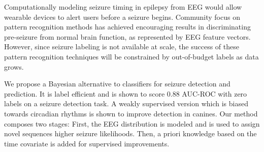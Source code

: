 
Computationally modeling seizure timing in epilepsy from EEG would allow wearable devices to alert users before a seizure begins. Community focus on pattern recognition methods has achieved encouraging results in discriminating pre-seizure from normal brain function, as represented by EEG feature vectors. However, since seizure labeling is not available at scale, the success of these pattern recognition techniques will be constrained by out-of-budget labels as data grows. 

We propose a Bayesian alternative to classifiers for seizure detection and prediction. It is label efficient and is shown to score 0.88 AUC-ROC with zero labels on a seizure detection task. A weakly supervised version which is biased towards circadian rhythms is shown to improve detection in canines. Our method composes two stages: First, the EEG distribution is modeled and is used to assign novel sequences higher seizure likelihoods. Then, a priori knowledge based on the time covariate is added for supervised improvements.

